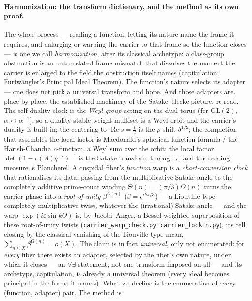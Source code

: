 \documentclass[11pt]{article}
\theoremstyle{definition}
\renewcommand{\Re}{\operatorname{Re}}
\begin{document}
\paragraph{Harmonization: the transform dictionary, and the method as its own proof.} The whole process ---
reading a function, letting its nature name the frame it requires, and enlarging or warping the carrier to
that frame so the function closes --- is one we call \emph{harmonization}, after its classical archetype: a
class-group obstruction is an untranslated frame mismatch that dissolves the moment the carrier is enlarged
to the field the obstruction itself names (capitulation; Furtw\"angler's Principal Ideal Theorem). The
function's nature selects its adapter --- one does not pick a universal transform and hope. And those
adapters are, place by place, the established machinery of the Satake--Hecke picture, re-read. The
self-duality clock
is the \emph{Weyl group} acting on the dual torus (for $\mathrm{GL}(2)$, $\alpha\leftrightarrow\alpha^{-1}$),
so a duality-stable weight multiset is a Weyl orbit and the carrier's duality is built in; the centering to
$\Re s=\tfrac12$ is the $\rho$-shift $\delta^{1/2}$; the completion that assembles the local factor is
Macdonald's spherical-function formula / the Harish-Chandra $c$-function, a Weyl sum over the orbit; the
local factor $\det(1-r(A)q^{-s})^{-1}$ is the Satake transform through $r$; and the reading measure is
Plancherel. A cuspidal fiber's \emph{function} warp is a \emph{chart-conversion clock} that rationalises its
data: passing from the multiplicative Satake angle to the completely additive prime-count winding
$\Theta(n)=(\pi/3)\Omega(n)$ turns the carrier phase into a \emph{root of unity} $\beta^{\Omega(n)}$
($\beta=e^{ik\pi/3}$) --- a Liouville-type completely multiplicative twist, whatever the (irrational) Satake
angle --- and the warp $\exp(i\varepsilon\sin k\Theta)$ is, by Jacobi--Anger, a Bessel-weighted superposition
of these root-of-unity twists (\texttt{carrier\_warp\_check.py}, \texttt{carrier\_lockin.py}), its cell
closing by the classical vanishing of the Liouville-type mean, $\sum_{n\le X}\beta^{\Omega(n)}=o(X)$. The claim is in fact
\emph{universal}, only not enumerated: for \emph{every} fiber there exists an adapter, selected by the
fiber's own nature, under which it closes --- an $\forall\exists$ statement, not one transform imposed on
all --- and its archetype, capitulation, is already a universal theorem (every ideal becomes principal in
the frame it names). What we decline is the enumeration of every (function, adapter) pair. The method is
\end{document}
